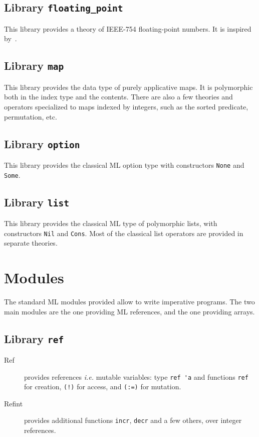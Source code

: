 \subsection{Library \texttt{floating\_point}}

This library provides a theory of IEEE-754 floating-point numbers. It
is inspired by~\cite{ayad10ijcar}.

\subsection{Library \texttt{map}}

This library provides the data type of purely applicative maps. It is
polymorphic both in the index type and the contents. There are also a
few theories and operators specialized to maps indexed by integers,
such as the sorted predicate, permutation, etc.

\subsection{Library \texttt{option}}

This library provides the classical ML option type with constructors
\verb|None| and \verb|Some|.

\subsection{Library \texttt{list}}

This library provides the classical ML type of polymorphic lists, with
constructors \verb|Nil| and \verb|Cons|. Most of the classical list
operators are provided in separate theories.

\section{Modules}
\label{sec:mllibrary}

The standard ML modules provided allow to write imperative
programs. The two main modules are the one providing ML references,
and the one providing arrays.

\subsection{Library \texttt{ref}}


\begin{description}
\item[Ref] provides references \emph{i.e.} mutable variables:
  type \verb|ref 'a| and functions \verb|ref| for creation,
  \verb|(!)| for access, and \verb|(:=)| for mutation.
\item[Refint] provides additional functions \texttt{incr},
  \texttt{decr} and a few others, over integer references.
\end{description}
\indextt{:=}

